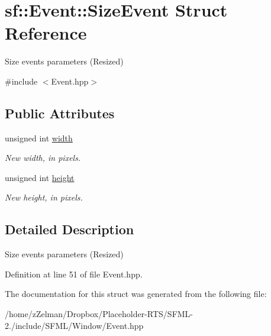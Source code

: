 \hypertarget{structsf_1_1Event_1_1SizeEvent}{\section{sf\-:\-:Event\-:\-:Size\-Event Struct Reference}
\label{structsf_1_1Event_1_1SizeEvent}
}


Size events parameters (Resized)  




{\ttfamily \#include $<$Event.\-hpp$>$}

\subsection*{Public Attributes}
\begin{DoxyCompactItemize}
\item 
\hypertarget{structsf_1_1Event_1_1SizeEvent_a20ea1b78c9bb1604432f8f0067bbfd94}{unsigned int \hyperlink{structsf_1_1Event_1_1SizeEvent_a20ea1b78c9bb1604432f8f0067bbfd94}{width}}\label{structsf_1_1Event_1_1SizeEvent_a20ea1b78c9bb1604432f8f0067bbfd94}

\begin{DoxyCompactList}\small\item\em New width, in pixels. \end{DoxyCompactList}\item 
\hypertarget{structsf_1_1Event_1_1SizeEvent_af0f76a599d5f48189cb8d78d4e5facdb}{unsigned int \hyperlink{structsf_1_1Event_1_1SizeEvent_af0f76a599d5f48189cb8d78d4e5facdb}{height}}\label{structsf_1_1Event_1_1SizeEvent_af0f76a599d5f48189cb8d78d4e5facdb}

\begin{DoxyCompactList}\small\item\em New height, in pixels. \end{DoxyCompactList}\end{DoxyCompactItemize}


\subsection{Detailed Description}
Size events parameters (Resized) 

Definition at line 51 of file Event.\-hpp.



The documentation for this struct was generated from the following file\-:\begin{DoxyCompactItemize}
\item 
/home/z\-Zelman/\-Dropbox/\-Placeholder-\/\-R\-T\-S/\-S\-F\-M\-L-\/2./include/\-S\-F\-M\-L/\-Window/Event.\-hpp\end{DoxyCompactItemize}
